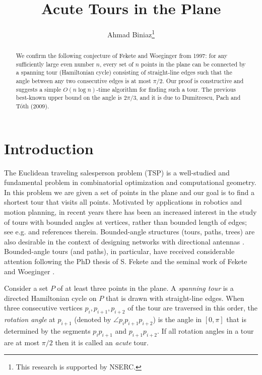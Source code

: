 \documentclass[11pt,letter]{article}
\title{Acute Tours in the Plane
}
\author{Ahmad Biniaz\thanks{This research is supported by NSERC.}
}
\affil{School of Computer Science, University of Windsor\\\texttt{ahmad.biniaz@gmail.com}}
\date{}
\begin{document}
	\maketitle
	\vspace{-10pt}
	\begin{abstract}
		We confirm the following conjecture of Fekete and Woeginger from 1997: for any sufficiently large even
		number $n$, every set of $n$ points in the plane can be connected by a spanning tour (Hamiltonian cycle) consisting of straight-line edges such that the angle between any two consecutive edges is at most $\pi/2$. Our proof is constructive and suggests a simple $O(n\log n)$-time algorithm for finding such a tour. The previous best-known upper bound on the angle is $2\pi/3$, and it is due to Dumitrescu, Pach and T{\'{o}}th (2009). 
	\end{abstract}

\section{Introduction}

The Euclidean traveling salesperson problem (TSP) is a well-studied and fundamental problem in combinatorial optimization and computational geometry. In this problem we are given a set of points in the plane and our goal is to find a shortest tour that visits all points. Motivated by applications in robotics and motion planning, in recent years there has been an increased interest in the study of tours with bounded angles at vertices, rather than bounded length of edges; see e.g. \cite{Aggarwal1999,Aichholzer2017,Dumitrescu12,Fekete1992,Fekete1997} and references therein.  Bounded-angle structures (tours, paths, trees) are also desirable in the context of designing networks with directional antennas \cite{Aschner2017,Aschner2012,Carmi2011,Tran2017}. Bounded-angle tours (and paths), in particular, have received considerable attention following the PhD thesis of S. Fekete \cite{Fekete1992} and the seminal work of Fekete and Woeginger \cite{Fekete1997}.

Consider a set $P$ of at least three points in the plane. A {\em spanning tour} is a directed Hamiltonian cycle on $P$ that is drawn with straight-line edges. When three consecutive vertices $p_i, p_{i+1},p_{i+2}$ of the tour are traversed in this order, the {\em rotation angle} at $p_{i+1}$ (denoted by $\angle p_ip_{i+1}p_{i+2}$) is the angle in $[0,\pi]$ that is determined by the segments $p_ip_{i+1}$ and $p_{i+1}p_{i+2}$. 
If all rotation angles in a tour are at most $\pi/2$ then it is called an {\em acute} tour. 
\end{document}
